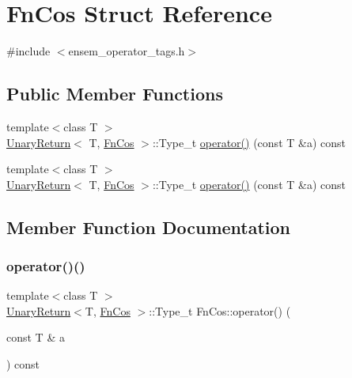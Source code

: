 \hypertarget{structFnCos}{}\section{Fn\+Cos Struct Reference}
\label{structFnCos}


{\ttfamily \#include $<$ensem\+\_\+operator\+\_\+tags.\+h$>$}

\subsection*{Public Member Functions}
\begin{DoxyCompactItemize}
\item 
{\footnotesize template$<$class T $>$ }\\\mbox{\hyperlink{structUnaryReturn}{Unary\+Return}}$<$ T, \mbox{\hyperlink{structFnCos}{Fn\+Cos}} $>$\+::Type\+\_\+t \mbox{\hyperlink{structFnCos_aaf33b1555b7687d8c211c90189ef0c5c}{operator()}} (const T \&a) const
\item 
{\footnotesize template$<$class T $>$ }\\\mbox{\hyperlink{structUnaryReturn}{Unary\+Return}}$<$ T, \mbox{\hyperlink{structFnCos}{Fn\+Cos}} $>$\+::Type\+\_\+t \mbox{\hyperlink{structFnCos_aaf33b1555b7687d8c211c90189ef0c5c}{operator()}} (const T \&a) const
\end{DoxyCompactItemize}


\subsection{Member Function Documentation}
\mbox{\label{structFnCos_aaf33b1555b7687d8c211c90189ef0c5c}} 
\subsubsection{\texorpdfstring{operator()()}{operator()()}\hspace{0.1cm}{\footnotesize\ttfamily [1/2]}}
{\footnotesize\ttfamily template$<$class T $>$ \\
\mbox{\hyperlink{structUnaryReturn}{Unary\+Return}}$<$T, \mbox{\hyperlink{structFnCos}{Fn\+Cos}} $>$\+::Type\+\_\+t Fn\+Cos\+::operator() (\begin{DoxyParamCaption}\item[{const T \&}]{a }\end{DoxyParamCaption}) const\hspace{0.3cm}{\ttfamily [inline]}}

